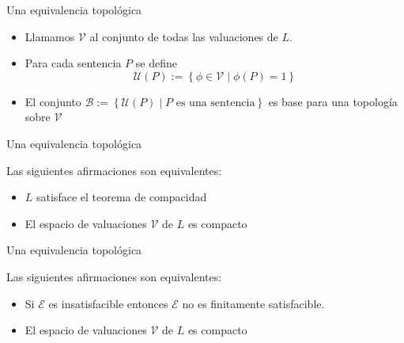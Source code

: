 \begin{frame}{Una equivalencia topológica}
   \begin{itemize}
      \item Llamamos $\mathcal{V}$ al conjunto de todas las valuaciones de $L$.
      \item <2-> Para cada sentencia $P$ se define 
         $$\mathcal{U}(P):=\left\lbrace \phi \in \mathcal{V}\mid \phi(P)=1 \right\rbrace$$
      \item <3-> El conjunto $\mathcal{B}:=\left\lbrace \mathcal{U}(P)\mid P \text{ es una sentencia}\right\rbrace$ es base para una topología sobre $\mathcal{V}$
   \end{itemize}
\end{frame}
\begin{frame}{Una equivalencia topológica}
   \begin{Hecho}
       Las siguientes afirmaciones son equivalentes:
       \begin{itemize}
          \item[(1)] $L$ satisface el teorema de compacidad
          \item[(2)] El espacio de valuaciones $\mathcal{V}$ de $L$ es compacto
       \vspace{0.3cm}
       \end{itemize}
   \end{Hecho}
\end{frame}
\begin{frame}{Una equivalencia topológica}
   \begin{Hecho}
       Las siguientes afirmaciones son equivalentes:
       \begin{itemize}
          \item[(1)] Si $\mathcal{E}$ es insatisfacible entonces $\mathcal{E}$ no es finitamente satisfacible.
          \item[(2)] El espacio de valuaciones $\mathcal{V}$ de $L$ es compacto
       \vspace{0.3cm}
       \end{itemize}
   \end{Hecho}
\end{frame}
